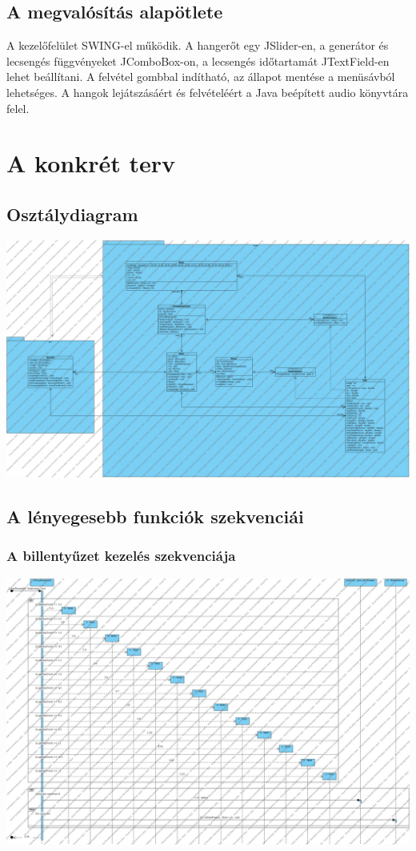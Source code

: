 \documentclass[11pt,a4paper]{report}
\begin{document}
	\section{A megvalósítás alapötlete}
	A kezelőfelület SWING-el működik. A hangerőt egy JSlider-en, a generátor és lecsengés függvényeket JComboBox-on, a lecsengés időtartamát JTextField-en lehet beállítani. A felvétel gombbal indítható, az állapot mentése a menüsávból lehetséges.
	A hangok lejátszásáért és felvételéért a Java beépített audio könyvtára felel.
	
	\chapter{A konkrét terv}
	
	\section{Osztálydiagram}
	\includegraphics[scale = 0.25]{cdia.png} \\
	
	\section{A lényegesebb funkciók szekvenciái}
	\subsection{A billentyűzet kezelés szekvenciája}
	\includegraphics[scale = 0.3]{note.png} \\
\end{document}
